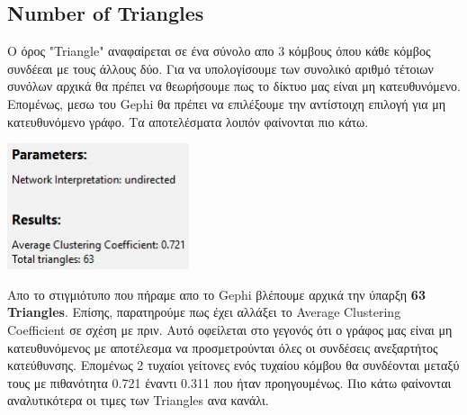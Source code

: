 \documentclass[12pt]{article}
\begin{document}
	\newpage
	\subsection{Number of Triangles}
	Ο όρος "Triangle" αναφαίρεται σε ένα σύνολο απο 3 κόμβους όπου κάθε κόμβος συνδέεαι με τους άλλους δύο. Για να υπολογίσουμε των συνολικό αριθμό τέτοιων συνόλων αρχικά θα πρέπει να θεωρήσουμε πως το δίκτυο μας είναι μη κατευθυνόμενο. Επομένως, μεσω του Gephi θα πρέπει να επιλέξουμε την αντίστοιχη επιλογή για μη κατευθυνόμενο γράφο. Τα αποτελέσματα λοιπόν φαίνονται πιο κάτω.
	\begin{center}
		\includegraphics[width=0.4\textwidth]{photos-files/section8/number_of_triangles.JPG}
	\end{center}
	Απο το στιγμιότυπο που πήραμε απο το Gephi βλέπουμε αρχικά την ύπαρξη \textbf{63 Triangles}. Επίσης, παρατηρούμε πως έχει αλλάξει το Average Clustering Coefficient σε σχέση με πριν. Αυτό οφείλεται στο γεγονός ότι ο γράφος μας είναι μη κατευθυνόμενος με αποτέλεσμα να προσμετρούνται όλες οι συνδέσεις ανεξαρτήτος κατεύθυνσης. Επομένως 2 τυχαίοι γείτονες ενός τυχαίου κόμβου θα συνδέονται μεταξύ τους με πιθανότητα 0.721 έναντι 0.311 που ήταν προηγουμένως.
	\newpage
	Πιο κάτω φαίνονται αναλυτικότερα οι τιμες των Triangles ανα κανάλι.
\end{document}
